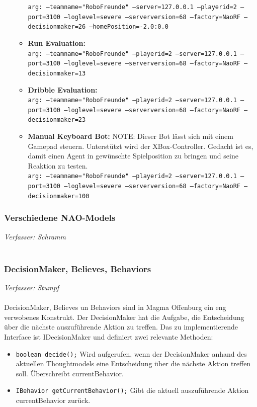 \documentclass[fontsize=12pt,a4paper,final]{scrartcl}[2003/01/01]
\begin{document}
\begin{itemize}
\begin{itemize}
\texttt{arg: --teamname="RoboFreunde" --server=127.0.0.1 --playerid=2 --port=3100 --loglevel=severe --serverversion=68 --factory=NaoRF --decisionmaker=26 --homePosition=-2.0:0.0}
	\item \textbf{Run Evaluation:}\\
\texttt{arg: --teamname="RoboFreunde" --playerid=2 --server=127.0.0.1  --port=3100 --loglevel=severe --serverversion=68 --factory=NaoRF --decisionmaker=13}
	\item \textbf{Dribble Evaluation:}\\
\texttt{arg: --teamname="RoboFreunde" --playerid=2 --server=127.0.0.1  --port=3100 --loglevel=severe --serverversion=68 --factory=NaoRF --decisionmaker=23}
	\item \textbf{Manual Keyboard Bot:} NOTE: Dieser Bot lässt sich mit einem Gamepad steuern. Unterstützt wird der XBox-Controller. Gedacht ist es, damit einen Agent in gewünschte Spielposition zu bringen und seine Reaktion zu testen.\\
\texttt{arg: --teamname="RoboFreunde" --playerid=2 --server=127.0.0.1  --port=3100 --loglevel=severe --serverversion=68 --factory=NaoRF --decisionmaker=100}
	\end{itemize}
\end{itemize}

\subsubsection{Verschiedene NAO-Models}
\label{sec:nao-models}
\textit{Verfasser: Schramm}\\
\\


\subsubsection{DecisionMaker, Believes, Behaviors} \label{sse:decisionmaker-belives-behaviors}
\textit{Verfasser: Stumpf}\\
\\
DecisionMaker, Believes un Behaviors sind in Magma Offenburg ein eng verwobenes Konstrukt. Der DecisionMaker hat die Aufgabe, die Entscheidung über die nächste auszuführende Aktion zu treffen. Das zu implementierende Interface ist IDecisionMaker und definiert zwei relevante Methoden:
\begin{itemize}
\item \texttt{boolean decide();} Wird aufgerufen, wenn der DecisionMaker anhand des aktuellen Thoughtmodels eine Entscheidung über die nächste Aktion treffen soll. Überschreibt currentBehavior.
\item \texttt{IBehavior getCurrentBehavior();} Gibt die aktuell auszuführende Aktion currentBehavior zurück.
\end{itemize}
\end{document}
